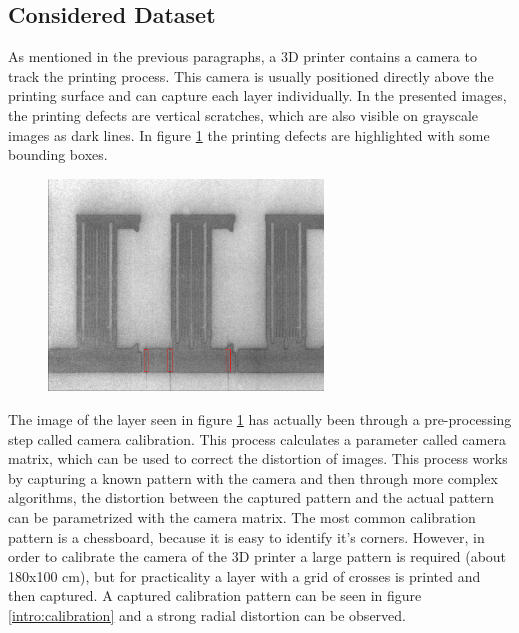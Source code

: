 \subsection{Considered Dataset}
As mentioned in the previous paragraphs, a 3D printer contains a camera to track the printing process. This camera is usually positioned directly above the printing surface and can capture each layer individually. In the presented images, the printing defects are vertical scratches, which are also visible on grayscale images as dark lines. In figure \ref{fig:layer_00325_marked_cropped} the printing defects are highlighted with some bounding boxes. \\

\begin{figure}[!h]
  \includegraphics[width=0.65\textwidth]{images/layer_00325_marked_cropped}
  \centering
  \caption{}
  \label{fig:layer_00325_marked_cropped}
\end{figure}

The image of the layer seen in figure \ref{fig:layer_00325_marked_cropped} has actually been through a pre-processing step called camera calibration. This process calculates a parameter called camera matrix, which can be used to correct the distortion of images. This process works by capturing a known pattern with the camera and then through more complex algorithms, the distortion between the captured pattern and the actual pattern can be parametrized with the camera matrix. The most common calibration pattern is a chessboard, because it is easy to identify it's corners. However, in order to calibrate the camera of the 3D printer a large pattern is required (about 180x100 cm), but for practicality a layer with a grid of crosses is printed and then captured. A captured calibration pattern can be seen in figure \ref{intro:calibration} and a strong radial distortion can be observed. \\


